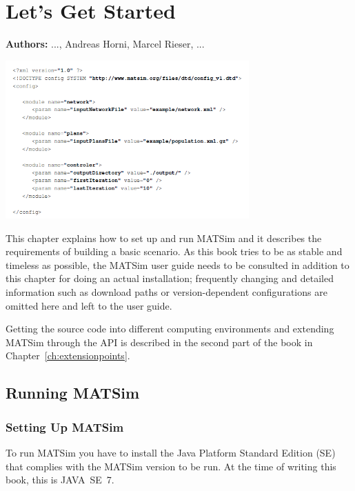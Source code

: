 \chapter{Let's Get Started}
\label{ch:lgstarted}
\hfill \textbf{Authors:} ..., Andreas Horni, Marcel Rieser, ...

\begin{center} \includegraphics[width=0.7\textwidth, angle=0]{using/figures/config.png} \end{center}

This chapter explains how to set up and run MATSim and it describes the requirements of building a basic scenario. As this book tries to be as stable and timeless as possible, the MATSim user guide \citep[][]{MATSim_Userguide_2014} needs to be consulted in addition to this chapter for doing an actual installation; frequently changing and detailed information such as download paths or version-dependent configurations are omitted here and left to the user guide. 

Getting the source code into different computing environments and extending MATSim through the API is described in the second part of the book in Chapter~\ref{ch:extensionpoints}.

\section{Running MATSim}
\label{sec:runningmatsim}

\subsection{Setting Up MATSim}
To run MATSim you have to install the Java Platform Standard Edition (SE) that complies with the MATSim version to be run. At the time of writing this book, this is JAVA~SE~7.

